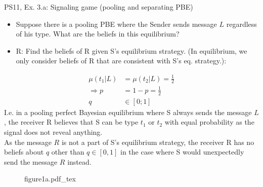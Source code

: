 \begin{frame}{PS11, Ex. 3.a: Signaling game (pooling and separating PBE)}
    \begin{itemize}
      \item[(a)] Suppose there is a pooling PBE where the Sender sends message $L$ regardless of his type. What are the beliefs in this equilibrium?
    \end{itemize} \vspace{-8pt}
    \begin{multicols}{2}
      \begin{itemize}
        \item[SR3:] R: Find the beliefs of R given S's equilibrium strategy. (In equilibrium, we only consider beliefs of R that are consistent with S's eq. strategy.):
      \end{itemize}\vspace{-4pt}
      \begin{align*}
        \mu(t_1|L)&=\mu(t_2|L)=\frac{1}{2}\\
        \Rightarrow p&=1-p=\frac{1}{2}\\
        q&\in[0;1]
      \end{align*}
      I.e. in a pooling perfect Bayesian equilibrium where S always sends the message $L$, the receiver R believes that S can be type $t_1$ or $t_2$ with equal probability as the signal does not reveal anything.\\\medskip
      As the message $R$ is not a part of S's equilibrium strategy, the receiver R has no beliefs about $q$ other than $q\in[0,1]$ in the case where S would unexpectedly send the message $R$ instead.
      \vfill\null\columnbreak
      \begin{figure}[!h]
        \center
        \def\svgwidth{\columnwidth}
        {figure1a.pdf_tex}
      \end{figure}
      \vfill\null \columnbreak
      \vfill
    \end{multicols}
\end{frame}


